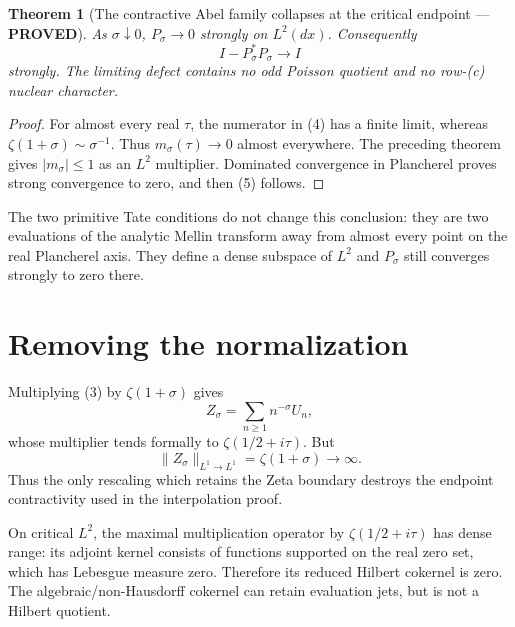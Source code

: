 \documentclass[11pt]{article}
\newcommand{\PROVED}{\textcolor{green!40!black}{\textbf{PROVED}}}
\newtheorem{theorem}{Theorem}
\begin{document}
\begin{theorem}[The contractive Abel family collapses at the critical
endpoint --- \PROVED]
As $\sigma\downarrow0$, $P_\sigma\to0$ strongly on $L^2(dx)$.  Consequently
\begin{equation}
                 I-P_\sigma^*P_\sigma\longrightarrow I        \tag{5}
\end{equation}
strongly.  The limiting defect contains no odd Poisson quotient and no
row-(c) nuclear character.
\end{theorem}

\begin{proof}
For almost every real $\tau$, the numerator in (4) has a finite limit,
whereas $\zeta(1+\sigma)\sim\sigma^{-1}$.  Thus
$m_\sigma(\tau)\to0$ almost everywhere.  The preceding theorem gives
$|m_\sigma|\le1$ as an $L^2$ multiplier.  Dominated convergence in
Plancherel proves strong convergence to zero, and then (5) follows.
\end{proof}

The two primitive Tate conditions do not change this conclusion: they are
two evaluations of the analytic Mellin transform away from almost every
point on the real Plancherel axis.  They define a dense subspace of $L^2$
and $P_\sigma$ still converges strongly to zero there.

\section{Removing the normalization}

Multiplying (3) by $\zeta(1+\sigma)$ gives
\begin{equation}
 Z_\sigma=\sum_{n\ge1}n^{-\sigma}U_n,                 \tag{6}
\end{equation}
whose multiplier tends formally to
$\zeta(1/2+i\tau)$.  But
\begin{equation}
                  \|Z_\sigma\|_{L^1\to L^1}
                  =\zeta(1+\sigma)\longrightarrow\infty.      \tag{7}
\end{equation}
Thus the only rescaling which retains the Zeta boundary destroys the
endpoint contractivity used in the interpolation proof.

On critical $L^2$, the maximal multiplication operator by
$\zeta(1/2+i\tau)$ has dense range: its adjoint kernel consists of functions
supported on the real zero set, which has Lebesgue measure zero.  Therefore
its reduced Hilbert cokernel is zero.  The algebraic/non-Hausdorff cokernel
can retain evaluation jets, but is not a Hilbert quotient.
\end{document}
